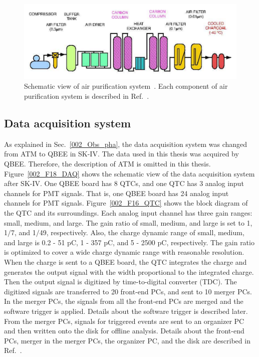 \begin{figure}[tbp]
	\centering
	\includegraphics[width=15cm]{Figures/002/F14_Air}
	\caption[Schematic view of air purification system]{\label{002_F14_Air} Schematic view of air purification system~\cite{2003Fukuda}. Each component of air purification system is described in Ref.~\cite{2015NakanoPhD}.}
\end{figure}

\subsection{Data acquisition system}
\vs\hs As explained in Sec.~\ref{002_Obs_pha}, the data acquisition system was changed from ATM to QBEE in SK-IV.
The data used in this thesis was acquired by QBEE.
Therefore, the description of ATM is omitted in this thesis.\\
\hs Figure~\ref{002_F18_DAQ} shows the schematic view of the data acquisition system after SK-IV.
One QBEE board has 8 QTCs, and one QTC has 3 analog input channels for PMT signals.
That is, one QBEE board has 24 analog input channels for PMT signals.
Figure~\ref{002_F16_QTC} shows the block diagram of the QTC and its surroundings.
Each analog input channel has three gain ranges: small, medium, and large.
The gain ratio of small, medium, and large is set to 1, 1$/$7, and 1$/$49, respectively.
Also, the charge dynamic range of small, medium, and large is 0.2 - 51 pC, 1 - 357 pC, and 5 - 2500 pC, respectively.
The gain ratio is optimized to cover a wide charge dynamic range with reasonable resolution.
When the charge is sent to a QBEE board, the QTC integrates the charge and generates the output signal with the width proportional to the integrated charge.
Then the output signal is digitized by time-to-digital converter (TDC).
The digitized signals are transferred to 20 front-end PCs, and sent to 10 merger PCs.
In the merger PCs, the signals from all the front-end PCs are merged and the software trigger is applied.
Details about the software trigger is described later.
From the merger PCs, signals for triggered events are sent to an organizer PC and then written onto the disk for offline analysis.
Details about the front-end PCs, merger in the merger PCs, the organizer PC, and the disk are described in Ref.~\cite{2010Yamada}.


